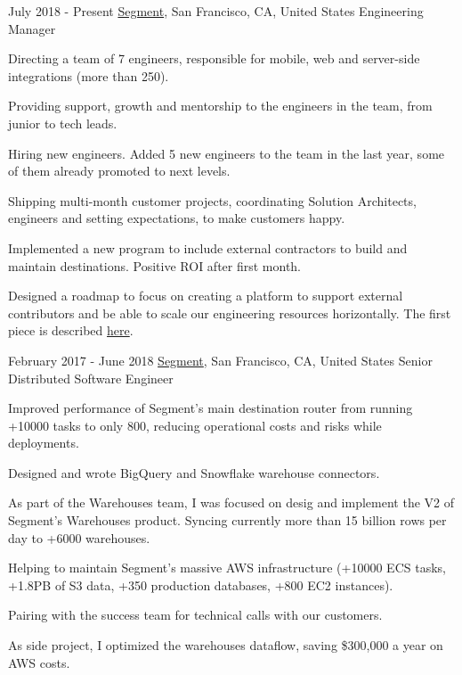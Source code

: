 
\experience
  {July 2018 - Present}
  {\href{https://segment.com}{Segment}, San Francisco, CA, United States}
  {Engineering Manager}
  {\vspace{-1em}\begin{rlist}
    \item Directing a team of 7 engineers, responsible for mobile, web and server-side integrations (more than 250).
    \item Providing support, growth and mentorship to the engineers in the team, from junior to tech leads.
    \item Hiring new engineers. Added 5 new engineers to the team in the last year, some of them already promoted to next levels.
    \item Shipping multi-month customer projects, coordinating Solution Architects, engineers and setting expectations, to make customers happy.
    \item Implemented a new program to include external contractors to build and maintain destinations. Positive ROI after first month.
    \item Designed a roadmap to focus on creating a platform to support external contributors and be able to scale our engineering resources
    horizontally. The first piece is described \href{https://segment.com/blog/unleashing-the-power-of-raw-data-with-amazon-lambda/}{here}.
  \end{rlist}}
  
\experience
  {February 2017 - June 2018}
  {\href{https://segment.com}{Segment}, San Francisco, CA, United States}
  {Senior Distributed Software Engineer}
  {\vspace{-1em}\begin{rlist}
    \item Improved performance of Segment's main destination router from running +10000 tasks to only 800, reducing operational
    costs and risks while deployments.
    \item Designed and wrote BigQuery and Snowflake warehouse connectors.
    \item As part of the Warehouses team, I was focused on desig and implement the V2 of Segment's Warehouses 
    product. Syncing currently more than 15 billion rows per day to +6000 warehouses.
    \item Helping to maintain Segment's massive AWS infrastructure (+10000 ECS tasks, +1.8PB of S3 data,
    +350 production databases, +800 EC2 instances).
    \item Pairing with the success team for technical calls with our customers. 
    \item As side project, I optimized the warehouses dataflow, saving \$300,000 a year on AWS costs.
  \end{rlist}}

